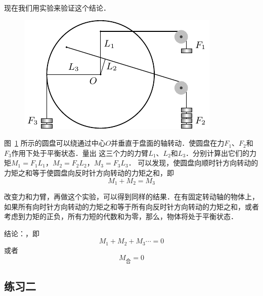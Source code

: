 现在我们用实验来验证这个结论．
\begin{figure}[htbp]
    \centering
    \includegraphics{fig/A/6-8.pdf}
    \caption{}\label{fig_A_6-8}
\end{figure}

图~\ref{fig_A_6-8} 所示的圆盘可以绕通过中心$O$并垂直于盘面的轴转动．使圆盘在力$F_1$、$F_2$和$F_3$作用下处于平衡状态．量出
这三个力的力臂$L_1$、$L_2$和$L_3$．分别计算出它们的力矩$M_1 =F_1 L_1$，$M_2 =F_2 L_2$，$M_3 =F_3 L_3$．
可以发现，使圆盘向顺时针方向转动的力矩之和等于使圆盘向反时针方向转动的力矩之和，即
\[M_1+M_2=M_3\]

改变力和力臂，再做这个实验，可以得到同样的结果．在有固定转动轴的物体上，如果所有向时针方向转动的力矩之和等于所有向反时针方向转动的力矩之和，或者考虑到力矩的正负，所有力短的代数和为零，那么，物体将处于平衡状态．

结论：，即
\[M_1+M_2+M_3\cdots=0 \]
或者
\[M_{\text{合}}=0\]

\subsection*{练习二}

